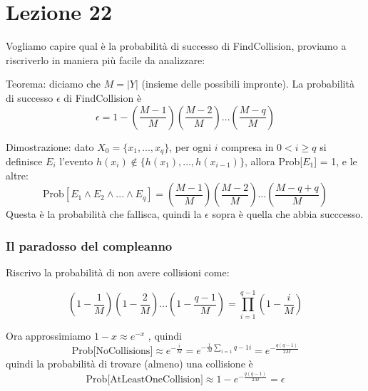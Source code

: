 \section*{Lezione 22}

Vogliamo capire qual è la probabilità di successo di FindCollision, proviamo a riscriverlo in maniera più facile da analizzare:

\medskip
\begin{algorithmic}
	\EndFor
	\EndIf
\end{algorithmic}

Teorema: diciamo che $M = |Y|$ (insieme delle possibili impronte). La probabilità di successo $\epsilon$ di FindCollision è 
\begin{equation*}
	\epsilon = 1 - (\frac{M-1}{M})(\frac{M-2}{M})...(\frac{M-q}{M})
\end{equation*}

Dimostrazione: dato $X_0 = \{x_1, ..., x_q\}$, per ogni $i$ compresa in $0 < i \geq q$ si definisce $E_i$ l'evento $h(x_i) \notin \{h(x_1), ..., h(x_{i-1})\}$, allora Prob[$E_1$] = 1, e le altre:
\begin{equation*}
	\text{Prob}[E_1 \land E_2 \land ... \land E_q] = (\frac{M-1}{M})(\frac{M-2}{M})...(\frac{M-q+q}{M})
\end{equation*}
Questa è la probabilità che fallisca, quindi la $\epsilon$ sopra è quella che abbia succcesso.

\subsubsection*{Il paradosso del compleanno}

Riscrivo la probabilità di non avere collisioni come:

\begin{equation*}
	(1 - \frac1M)(1 - \frac2M) ... (1 - \frac{q-1}{M}) = \prod_{i=1}^{q-1}(1 - \frac{i}{M})
\end{equation*}

Ora approssimiamo $1-x \approx e^{-x}$ , quindi
\begin{equation*}
	\text{Prob[NoCollisions]} \approx e^{-\frac{i}{M}} = e^{-\frac1M \sum_{i=1}{q-1}i} = e^{-\frac{q(q-1)}{2M}}
\end{equation*}
quindi la probabilità di trovare (almeno) una collisione è
\begin{equation*}
	\text{Prob[AtLeastOneCollision]} \approx 1 - e^{-\frac{q(q-1)}{2M}} = \epsilon
\end{equation*}


